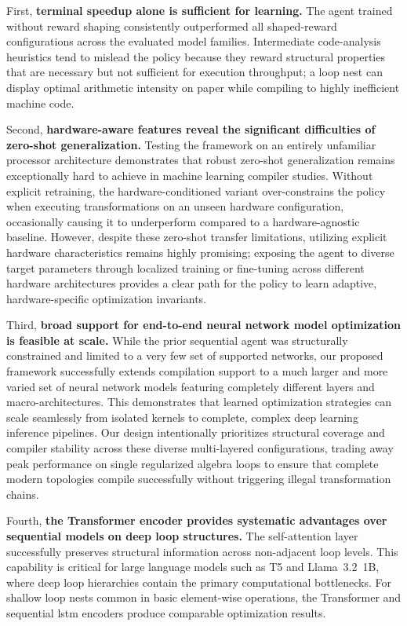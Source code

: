 First, \textbf{terminal speedup alone is sufficient for learning.} The agent trained without reward shaping consistently outperformed all shaped-reward configurations across the evaluated model families. Intermediate code-analysis heuristics tend to mislead the policy because they reward structural properties that are necessary but not sufficient for execution throughput; a loop nest can display optimal arithmetic intensity on paper while compiling to highly inefficient machine code.

Second, \textbf{hardware-aware features reveal the significant difficulties of zero-shot generalization.} Testing the framework on an entirely unfamiliar processor architecture demonstrates that robust zero-shot generalization remains exceptionally hard to achieve in machine learning compiler studies. Without explicit retraining, the hardware-conditioned variant over-constrains the policy when executing transformations on an unseen hardware configuration, occasionally causing it to underperform compared to a hardware-agnostic baseline. However, despite these zero-shot transfer limitations, utilizing explicit hardware characteristics remains highly promising; exposing the agent to diverse target parameters through localized training or fine-tuning across different hardware architectures provides a clear path for the policy to learn adaptive, hardware-specific optimization invariants.

Third, \textbf{broad support for end-to-end neural network model optimization is feasible at scale.} While the prior sequential agent was structurally constrained and limited to a very few set of supported networks, our proposed framework successfully extends compilation support to a much larger and more varied set of neural network models featuring completely different layers and macro-architectures. This demonstrates that learned optimization strategies can scale seamlessly from isolated kernels to complete, complex deep learning inference pipelines. Our design intentionally prioritizes structural coverage and compiler stability across these diverse multi-layered configurations, trading away peak performance on single regularized algebra loops to ensure that complete modern topologies compile successfully without triggering illegal transformation chains.

Fourth, \textbf{the Transformer encoder provides systematic advantages over sequential models on deep loop structures.} The self-attention layer successfully preserves structural information across non-adjacent loop levels. This capability is critical for large language models such as T5 and Llama~3.2~1B, where deep loop hierarchies contain the primary computational bottlenecks. For shallow loop nests common in basic element-wise operations, the Transformer and sequential \gls{lstm} encoders produce comparable optimization results.

